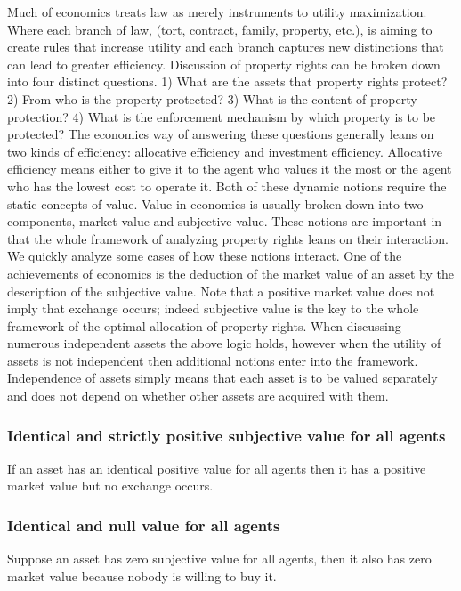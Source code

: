 \documentclass[12pt]{article}
\numberwithin{equation}{section}
\begin{document}
Much of economics treats law as merely instruments to utility maximization. Where each branch of law, (tort, contract, family, property, etc.), is aiming to create rules that increase utility and each branch captures new distinctions that can lead to greater efficiency. Discussion of property rights can be broken down into four distinct questions. 1) What are the assets that property rights protect? 2) From who is the property protected? 3) What is the content of property protection? 4) What is the enforcement mechanism by which property is to be protected?  The economics way of answering these questions generally leans on two kinds of efficiency: allocative efficiency and investment efficiency. Allocative efficiency means either to give it to the agent who values it the most or the agent who has the lowest cost to operate it. Both of these dynamic notions require the static concepts of value. Value in economics is usually broken down into two components, market value and subjective value. These notions are important in that the whole framework of analyzing property rights leans on their interaction. We quickly analyze some cases of how these notions interact. One of the achievements of economics is the deduction of the market value of an asset by the description of the subjective value. Note that a positive market value does not imply that exchange occurs; indeed subjective value is the key to the whole framework of the optimal allocation of property rights. When discussing numerous independent assets the above logic holds, however when the utility of assets is not independent then additional notions enter into the framework. Independence of assets simply means that each asset is to be valued separately and does not depend on whether other assets are acquired with them.


\subsubsection{Identical and strictly positive subjective value for all agents}

If an asset has an identical positive value for all agents then it has a positive market value but no exchange occurs.

\subsubsection{Identical and null value for all agents}

Suppose an asset has zero subjective value for all agents, then it also has zero market value because nobody is willing to buy it.
\end{document}
